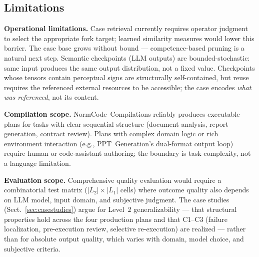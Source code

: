 \subsection{Limitations}

\textbf{Operational limitations.} Case retrieval currently requires operator judgment to
select the appropriate fork target; learned similarity measures would lower this barrier.
The case base grows without bound --- competence-based pruning is a natural next step.
Semantic checkpoints (LLM outputs) are bounded-stochastic: same input produces the same
output distribution, not a fixed value. Checkpoints whose tensors contain perceptual
signs are structurally self-contained, but reuse requires the referenced external
resources to be accessible; the case encodes \textit{what was referenced}, not its
content.

\textbf{Compilation scope.} NormCode~Compilations reliably produces executable plans for
tasks with clear sequential structure (document analysis, report generation, contract
review). Plans with complex domain logic or rich environment interaction (e.g.,
PPT~Generation's dual-format output loop) require human or code-assistant authoring;
the boundary is task complexity, not a language limitation.

\textbf{Evaluation scope.} Comprehensive quality evaluation would require a
combinatorial test matrix ($|L_2| \times |L_1|$ cells) where outcome quality also
depends on LLM model, input domain, and subjective judgment. The case studies
(Sect.~\ref{sec:casestudies}) argue for Level~2 generalizability --- that structural
properties hold across the four production plans and that C1--C3 (failure localization,
pre-execution review, selective re-execution) are realized --- rather than for absolute
output quality, which varies with domain, model choice, and subjective criteria.


